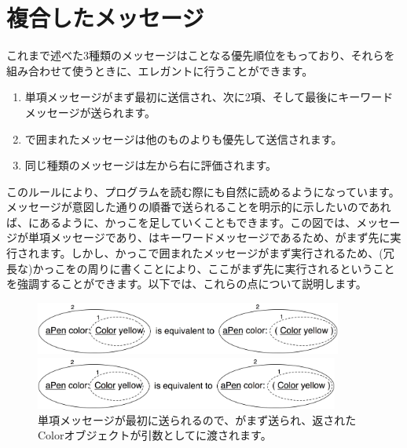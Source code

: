 \documentclass[a4paper,10pt,twoside]{book}
\begin{document}

\section{複合したメッセージ}
これまで述べた3種類のメッセージはことなる優先順位をもっており、それらを組み合わせて使うときに、エレガントに行うことができます。

\begin{enumerate}
\item 単項メッセージがまず最初に送信され、次に2項、そして最後にキーワードメッセージが送られます。
\item {}で囲まれたメッセージは他のものよりも優先して送信されます。
\item 同じ種類のメッセージは左から右に評価されます。
\end{enumerate}

このルールにより、プログラムを読む際にも自然に読めるようになっています。メッセージが意図した通りの順番で送られることを明示的に示したいのであれば、にあるように、かっこを足していくこともできます。この図では、メッセージが単項メッセージであり、はキーワードメッセージであるため、がまず先に実行されます。しかし、かっこで囲まれたメッセージがまず実行されるため、(冗長な)かっこをの周りに書くことにより、ここがまず先に実行されるということを強調することができます。以下では、これらの点について説明します。

\begin{figure}[ht]
\ifluluelse
	{\centerline{\includegraphics[width=0.9\textwidth]{uKeyUn}} }
	{\centerline{\includegraphics[width=10cm]{uKeyUn}} }
\caption{単項メッセージが最初に送られるので、がまず送られ、返されたColorオブジェクトが引数としてに渡されます。}
\end{figure}
\end{document}
